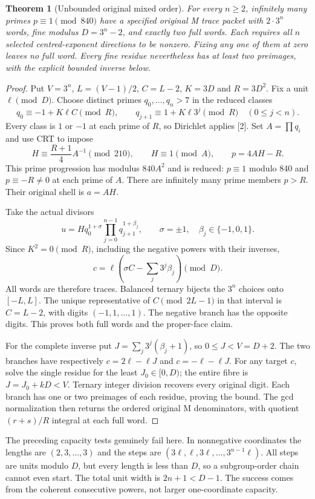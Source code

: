\documentclass[10pt]{article}
\newtheorem{theorem}{Theorem}
\begin{document}
\begin{theorem}[Unbounded original mixed order]
For every $n\ge2$, infinitely many primes $p\equiv1\pmod{840}$ have a
specified original M trace packet with $2\cdot3^n$ words, fine modulus
$D=3^n-2$, and exactly two full words. Each requires all $n$ selected
centred-exponent directions to be nonzero. Fixing any one of them at zero
leaves no full word. Every fine residue nevertheless has at least two
preimages, with the explicit bounded inverse below.
\end{theorem}
\begin{proof}
Put $V=3^n$, $L=(V-1)/2$, $C=L-2$, $K=3D$ and $R=3D^2$. Fix a unit
$\ell\pmod D$. Choose distinct primes $q_0,\ldots,q_n>7$ in the reduced
classes
\[
 q_0\equiv-1+K\ell C\pmod R,
 \qquad q_{j+1}\equiv1+K\ell3^j\pmod R\quad(0\le j<n).
\]
Every class is $1$ or $-1$ at each prime of $R$, so Dirichlet applies [2].
Set $A=\prod q_i$ and use CRT to impose
\[
 H\equiv\frac{R+1}{4}A^{-1}\pmod{210},\qquad H\equiv1\pmod A,
 \qquad p=4AH-R.
\]
This prime progression has modulus $840A^2$ and is reduced: $p\equiv1$
modulo 840 and $p\equiv-R\ne0$ at each prime of $A$. There are infinitely
many prime members $p>R$. Their original shell is $a=AH$.

Take the actual divisors
\[
 u=Hq_0^{1+\sigma}\prod_{j=0}^{n-1}q_{j+1}^{1+\beta_j},
 \qquad\sigma=\pm1,\quad\beta_j\in\{-1,0,1\}.
\]
Since $K^2=0\pmod R$, including the negative powers with their inverses,
\[
 c=\ell\left(\sigma C-\sum_j3^j\beta_j\right)\pmod D.
\]
All words are therefore traces. Balanced ternary bijects the $3^n$ choices
onto $[-L,L]$. The unique representative of $C\pmod{2L-1}$ in that interval
is $C=L-2$, with digits $(-1,1,\ldots,1)$. The negative branch has the
opposite digits. This proves both full words and the proper-face claim.

For the complete inverse put $J=\sum_j3^j(\beta_j+1)$, so $0\le J<V=D+2$.
The two branches have respectively
$c=2\ell-\ell J$ and $c=-\ell-\ell J$. For any target $c$, solve the
single residue for the least $J_0\in[0,D)$; the entire fibre is
$J=J_0+kD<V$. Ternary integer division recovers every original digit.
Each branch has one or two preimages of each residue, proving the bound.
The gcd normalization then returns the ordered original M denominators,
with quotient $(r+s)/R$ integral at each full word.
\end{proof}

The preceding capacity tests genuinely fail here. In nonnegative
coordinates the lengths are $(2,3,\ldots,3)$ and the steps are
$(3\ell,\ell,3\ell,\ldots,3^{n-1}\ell)$. All steps are units modulo $D$,
but every length is less than $D$, so a subgroup-order chain cannot even
start. The total unit width is $2n+1<D-1$. The success comes from the
coherent consecutive powers, not larger one-coordinate capacity.
\end{document}
